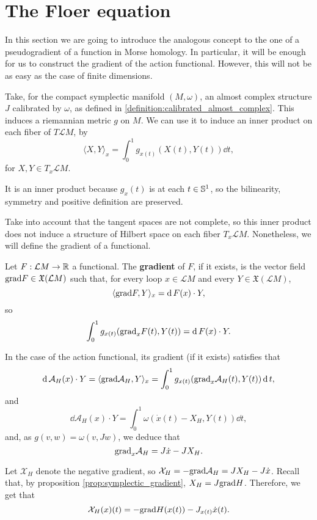 \section{The Floer equation}

In this section we are going to introduce the analogous concept to the one of a pseudogradient of a function in Morse homology. In particular, it will be enough for us to construct the gradient of the action functional. However, this will not be as easy as the case of finite dimensions.

Take, for the compact symplectic manifold $(M,\omega)$, an almost complex structure $J$ calibrated by $\omega$, as defined in \ref{definition:calibrated_almost_complex}. This induces a riemannian metric $g$ on $M$. We can use it to induce an inner product on each fiber of $T\mathcal{L}M$, by
$$\langle X, Y \rangle_x = \int_0^1 g_{x(t)} (X(t), Y(t)) \dd t,$$
for $X,Y \in T_x\mathcal{L}M$.

It is an inner product because $g_x(t)$ is at each $t \in \mathbb{S}^1$, so the bilinearity, symmetry and positive definition are preserved.

Take into account that the tangent spaces are not complete, so this inner product does not induce a structure of Hilbert space on each fiber $T_x\mathcal{L}M$. Nonetheless, we will define the gradient of a functional.

\begin{deff}
Let $F : \mathcal{L}M \rightarrow \mathbb{R}$ a functional. The {\bf gradient} of $F$, if it exists, is the vector field $\text{grad} F \in \mathfrak{X}(\mathcal{L}M)$ such that, for every loop $x \in \mathcal{L}M$ and every $Y \in \mathfrak{X}(\mathcal{L}M)$,
$$\langle \text{grad} F, Y \rangle_x = \operatorname d F(x) \cdot Y ,$$
so
$$\int_0^1 g_{x(t)}(\text{grad}_xF(t),Y(t)) = \operatorname d F(x) \cdot Y .$$
\end{deff}

In the case of the action functional, its gradient (if it exists) satisfies that
$$\operatorname d \mathcal{A}_H(x) \cdot Y = \langle \text{grad}\mathcal{A}_H, Y \rangle_x = \int_0^1 g_{x(t)}(\text{grad}_x\mathcal{A}_H(t),Y(t)) \operatorname d t ,$$
and
$$\dd \mathcal{A}_H(x) \cdot Y = \int_0^1 \omega(\dot{x}(t)-X_H,Y(t)) \dd t ,$$
and, as $g(v,w) = \omega(v,Jw)$, we deduce that
$$\text{grad}_x\mathcal{A}_H = J\dot{x} - J X_H .$$

Let $\mathcal{X}_H$ denote the negative gradient, so $\mathcal{X}_H = - \text{grad}\mathcal{A}_H = J X_H - J \dot{x}$. Recall that, by proposition \ref{prop:symplectic_gradient}, $X_H = J \text{grad} H$. Therefore, we get that
$$\mathcal{X}_H(x)(t) = - \text{grad} H(x(t)) - J_{x(t)} \dot{x}(t) .$$


